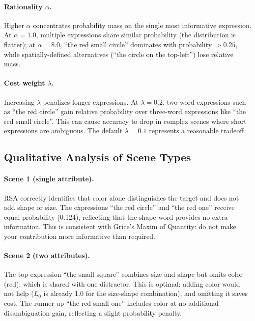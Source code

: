 \documentclass[10pt]{article}
\begin{document}
\paragraph{Rationality $\alpha$.} Higher $\alpha$ concentrates probability mass on the single most informative expression. At $\alpha = 1.0$, multiple expressions share similar probability (the distribution is flatter); at $\alpha = 8.0$, ``the red small circle'' dominates with probability $> 0.25$, while spatially-defined alternatives (``the circle on the top-left'') lose relative mass. 

\paragraph{Cost weight $\lambda$.} Increasing $\lambda$ penalizes longer expressions. At $\lambda = 0.2$, two-word expressions such as ``the red circle'' gain relative probability over three-word expressions like ``the red small circle''. This can cause accuracy to drop in complex scenes where short expressions are ambiguous. The default $\lambda = 0.1$ represents a reasonable tradeoff.

\subsection{Qualitative Analysis of Scene Types}

\paragraph{Scene 1 (single attribute).} RSA correctly identifies that color alone distinguishes the target and does not add shape or size. The expressions ``the red circle'' and ``the red one'' receive equal probability (0.124), reflecting that the shape word provides no extra information. This is consistent with Grice's Maxim of Quantity: do not make your contribution more informative than required.

\paragraph{Scene 2 (two attributes).} The top expression ``the small square'' combines size and shape but omits color (red), which is shared with one distractor. This is optimal: adding color would not help ($L_0$ is already 1.0 for the size-shape combination), and omitting it saves cost. The runner-up ``the red small one'' includes color at no additional disambiguation gain, reflecting a slight probability penalty.
\end{document}
